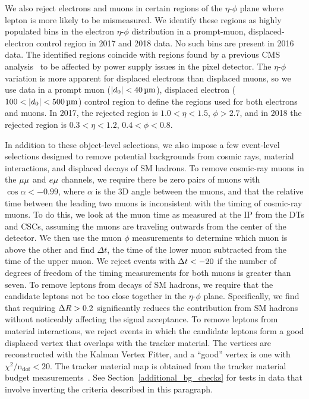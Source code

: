 

We also reject electrons and muons in certain regions of the $\eta$-$\phi$ plane where lepton \ad is more likely to be mismeasured. We identify these regions as highly populated bins in the electron $\eta$-$\phi$ distribution in a prompt-muon, displaced-electron control region in 2017 and 2018 data. No such bins are present in 2016 data. The identified regions coincide with regions found by a previous CMS analysis~\cite{CMS:DisaTrack} to be affected by power supply issues in the pixel detector. The $\eta$-$\phi$ variation is more apparent for displaced electrons than displaced muons, so we use data in a prompt muon ($\ad<\SI{40}{\um}$), displaced electron ($\num{100}<\ad<\SI{500}{\um}$) control region to define the  regions used for both electrons and muons. In 2017, the rejected region is $1.0<\eta<1.5$, $\phi>2.7$, and in 2018 the rejected region is $0.3<\eta<1.2$, $0.4<\phi<0.8$.

In addition to these object-level selections, we also impose a few event-level selections designed to remove potential backgrounds from cosmic rays, material interactions, and displaced decays of SM hadrons. To remove cosmic-ray muons in the ${\mu}{\mu}$ and $e{\mu}$ channels, we require there be zero pairs of muons with $\cos{\alpha}<-0.99$, where $\alpha$ is the 3D angle between the muons, and that the relative time between the leading two muons is inconsistent with the timing of cosmic-ray muons. To do this, we look at the muon time as measured at the IP from the DTs and CSCs, assuming the muons are traveling outwards from the center of the detector. We then use the muon $\phi$ measurements to determine which muon is above the other and find $\Delta t$, the time of the lower muon subtracted from the time of the upper muon. We reject events with $\Delta t< -20\ns$ if the number of degrees of freedom of the timing measurements for both muons is greater than seven. To remove leptons from decays of SM hadrons, we require that the candidate leptons not be too close together in the $\eta$-$\phi$ plane. Specifically, we find that requiring $\Delta R>0.2$ significantly reduces the contribution from SM hadrons without noticeably affecting the signal acceptance. To remove leptons from material interactions, we reject events in which the candidate leptons form a good displaced vertex that overlaps with the tracker material. The vertices are reconstructed with the Kalman Vertex Fitter, and a ``good'' vertex is one with $\chi^{2}/\mathrm{n_{dof}}< 20$. The tracker material map is obtained from the tracker material budget measurements~\cite{Sirunyan:2018icq,CMS-DP-2019-001}. See Section~\ref{additional_bg_checks} for tests in data that involve inverting the criteria described in this paragraph. 

